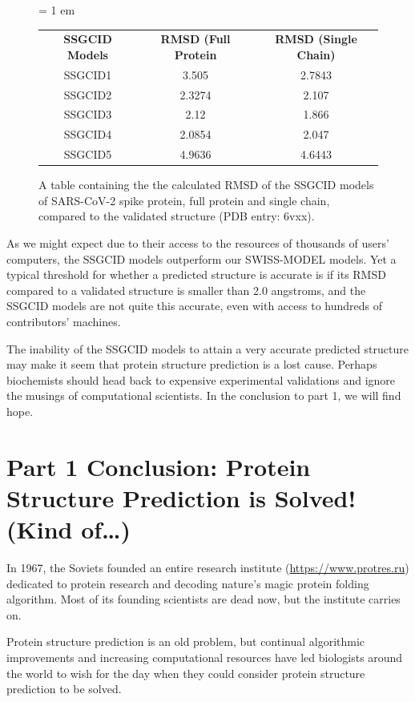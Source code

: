 \begin{figure}[h]
	\centering
	\tabcolsep = 1 em
	\mySfFamily
	\begin{tabular}{c c c}
		\textbf{SSGCID Models} & \textbf{RMSD (Full Protein} & \textbf{RMSD (Single Chain)} \\
		SSGCID1  & 3.505 & 2.7843 \\
		SSGCID2  & 2.3274 & 2.107 \\
		SSGCID3  & 2.12 & 1.866 \\
		SSGCID4  & 2.0854 & 2.047 \\
		SSGCID5  & 4.9636 & 4.6443 \\
	\end{tabular}
	\caption{A table containing the the calculated RMSD of the SSGCID models of SARS-CoV-2 spike protein, full protein and single chain, compared to the validated structure (PDB entry: 6vxx).}
	\label{fig:ssgcid_rmsd_table}
\end{figure}

As we might expect due to their access to the resources of thousands of users' computers, the SSGCID models outperform our SWISS-MODEL models. Yet a typical threshold for whether a predicted structure is accurate is if its RMSD compared to a validated structure is smaller than 2.0 angstroms, and the SSGCID models are not quite this accurate, even with access to hundreds of contributors' machines.

The inability of the SSGCID models to attain a very accurate predicted structure may make it seem that protein structure prediction is a lost cause. Perhaps biochemists should head back to expensive experimental validations and ignore the musings of computational scientists. In the conclusion to part 1, we will find hope.

\FloatBarrier
{}

\section{Part 1 Conclusion: Protein Structure Prediction is Solved! (Kind of…)}
\label{sec:conclusion_part_1}

In 1967, the Soviets founded an entire research institute (\url{https://www.protres.ru}) dedicated to protein research and decoding nature's magic protein folding algorithm. Most of its founding scientists are dead now, but the institute carries on.

Protein structure prediction is an old problem, but continual algorithmic improvements and increasing computational resources have led biologists around the world to wish for the day when they could consider protein structure prediction to be solved.

